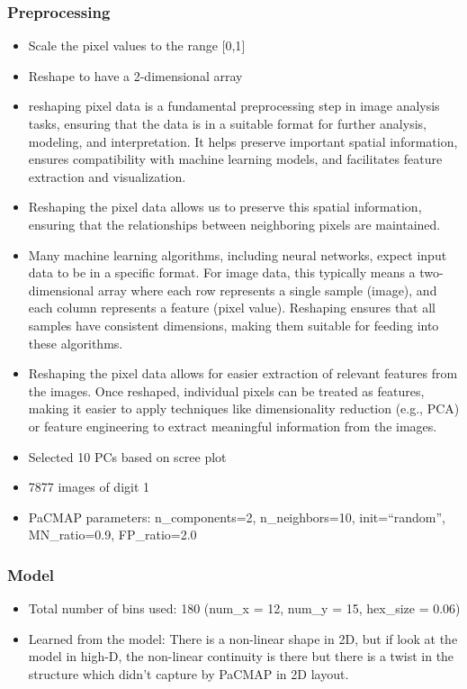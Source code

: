\documentclass[
  12pt]{article}
\begin{document}
\hypertarget{preprocessing}{%
\subsubsection{Preprocessing}\label{preprocessing}}

\begin{itemize}
\item
  Scale the pixel values to the range {[}0,1{]}
\item
  Reshape to have a 2-dimensional array
\item
  reshaping pixel data is a fundamental preprocessing step in image
  analysis tasks, ensuring that the data is in a suitable format for
  further analysis, modeling, and interpretation. It helps preserve
  important spatial information, ensures compatibility with machine
  learning models, and facilitates feature extraction and visualization.
\item
  Reshaping the pixel data allows us to preserve this spatial
  information, ensuring that the relationships between neighboring
  pixels are maintained.
\item
  Many machine learning algorithms, including neural networks, expect
  input data to be in a specific format. For image data, this typically
  means a two-dimensional array where each row represents a single
  sample (image), and each column represents a feature (pixel value).
  Reshaping ensures that all samples have consistent dimensions, making
  them suitable for feeding into these algorithms.
\item
  Reshaping the pixel data allows for easier extraction of relevant
  features from the images. Once reshaped, individual pixels can be
  treated as features, making it easier to apply techniques like
  dimensionality reduction (e.g., PCA) or feature engineering to extract
  meaningful information from the images.
\item
  Selected 10 PCs based on scree plot
\item
  7877 images of digit 1
\item
  PaCMAP parameters: n\_components=2, n\_neighbors=10, init=``random'',
  MN\_ratio=0.9, FP\_ratio=2.0
\end{itemize}

\hypertarget{model}{%
\subsubsection{Model}\label{model}}

\begin{itemize}
\item
  Total number of bins used: 180 (num\_x = 12, num\_y = 15, hex\_size =
  0.06)
\item
  Learned from the model: There is a non-linear shape in 2D, but if look
  at the model in high-D, the non-linear continuity is there but there
  is a twist in the structure which didn't capture by PaCMAP in 2D
  layout.
\end{itemize}
\end{document}
